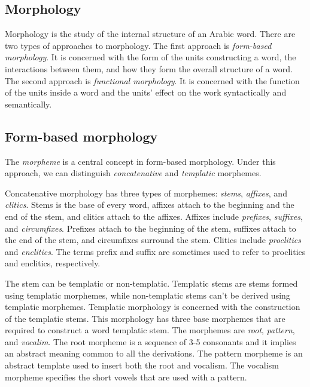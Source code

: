 


\doublespacing

\begin{appendices}



\section{Morphology}

Morphology is the study of the internal structure of an Arabic word. 
There are two types of approaches to morphology. 
The first approach is \textit{form-based morphology}. 
It is concerned with the form of the units constructing a word, 
the interactions between them, and how they form the overall structure of a word. 
The second approach is \textit{functional morphology}. 
It is concerned with the function of the units inside a word and the units' effect 
on the work syntactically and semantically.

\subsection{Form-based morphology}
The \textit{morpheme} is a central concept in form-based morphology.
Under this approach, we can distinguish \textit{concatenative} and \textit{templatic} morphemes. 

Concatenative morphology has three types of morphemes: \textit{stems}, \textit{affixes}, and \textit{clitics}. 
Stems is the base of every word, affixes attach to the beginning and the end of the stem, 
and clitics attach to the affixes. 
Affixes include \textit{prefixes}, \textit{suffixes}, and \textit{circumfixes}. 
Prefixes attach to the beginning of the stem, suffixes attach to the end of the stem, and 
circumfixes surround the stem. 
Clitics include \textit{proclitics} and \textit{enclitics}. 
The terms prefix and suffix are sometimes used to refer to proclitics and 
enclitics, respectively.

The stem can be templatic or non-templatic. 
Templatic stems are stems formed using templatic morphemes, 
while non-templatic stems can't be derived using templatic morphemes. 
Templatic morphology is concerned with the construction of the templatic stems. 
This morphology has three base morphemes that are required to construct a word templatic stem. 
The morphemes are \textit{root}, \textit{pattern}, and \textit{vocalim}. 
The root morpheme is a sequence of 3-5 consonants and 
it implies an abstract meaning common to all the derivations. 
The pattern morpheme is an abstract template used to insert both the root and vocalism. 
The vocalism morpheme specifies the short vowels that are used with a pattern.


\end{appendices}
